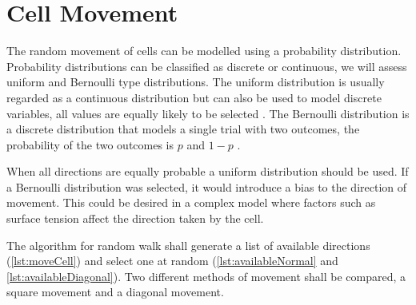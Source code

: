 \section{Cell Movement}


The random movement of cells can be modelled using a probability distribution.
Probability distributions can be classified as discrete or continuous, we will assess uniform and Bernoulli type distributions.
The uniform distribution is usually regarded as a continuous distribution but can also be used to model discrete variables,
all values are equally likely to be selected \autocite{libretextsUniformDistribution2023}.
The Bernoulli distribution is a discrete distribution that models a single trial with two outcomes,
the probability of the two outcomes is $p$ and $1-p$ \autocite{libretextsBernoulliDistribution2021}.







When all directions are equally probable a uniform distribution should be used.
If a Bernoulli distribution was selected, it would introduce a bias to the direction of movement.
This could be desired in a complex model where factors such as surface tension affect the direction taken by the cell.

The algorithm for random walk shall generate a list of available directions (\autoref{lst:moveCell}) and select one at random (\autoref{lst:availableNormal} and \autoref{lst:availableDiagonal}).
Two different methods of movement shall be compared, a square movement and a diagonal movement.

